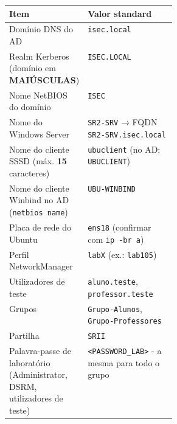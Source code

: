 \begin{center}\small
\begin{tabularx}{\linewidth}{|>{\raggedright\arraybackslash}p{0.32\linewidth}|>{\raggedright\arraybackslash}X|}
\hline
\rowcolor{azul!10}\textbf{Item} & \textbf{Valor standard} \\
\hline
Domínio DNS do AD & \texttt{isec.local} \\
\hline
Realm Kerberos (domínio em \textbf{MAIÚSCULAS}) & \texttt{ISEC.LOCAL} \\
\hline
Nome NetBIOS do domínio & \texttt{ISEC} \\
\hline
Nome do Windows Server & \texttt{SR2-SRV} → FQDN \texttt{SR2-SRV.isec.local} \\
\hline
Nome do cliente SSSD (máx. \textbf{15} caracteres) & \texttt{ubuclient} (no AD: \texttt{UBUCLIENT}) \\
\hline
Nome do cliente Winbind no AD (\texttt{netbios name}) & \texttt{UBU-WINBIND} \\
\hline
Placa de rede do Ubuntu & \texttt{ens18} (confirmar com \texttt{ip -br a}) \\
\hline
Perfil NetworkManager & \texttt{labX} (ex.: \texttt{lab105}) \\
\hline
Utilizadores de teste & \texttt{aluno.teste}, \texttt{professor.teste} \\
\hline
Grupos & \texttt{Grupo-Alunos}, \texttt{Grupo-Professores} \\
\hline
Partilha & \texttt{SRII} \\
\hline
Palavra-passe de laboratório (Administrator, DSRM, utilizadores de teste) & \texttt{\textless{}PASSWORD\_LAB\textgreater{}} - a mesma para todo o grupo \\
\hline
\end{tabularx}
\end{center}
